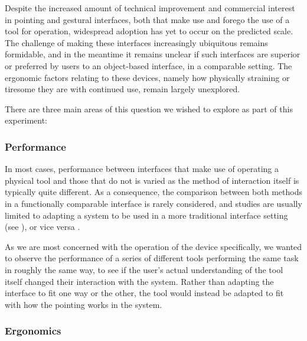 Despite the increased amount of technical improvement and commercial interest in pointing and gestural interfaces, both that make use and forego the use of a tool for operation, widespread adoption has yet to occur on the predicted scale. The challenge of making these interfaces increasingly ubiquitous remains formidable, and in the meantime it remains unclear if such interfaces are superior or preferred by users to an object-based interface, in a comparable setting. The ergonomic factors relating to these devices, namely how physically straining or tiresome they are with continued use, remain largely unexplored.

There are three main areas of this question we wished to explore as part of this experiment:


\subsubsection{Performance}

In most cases, performance between interfaces that make use of operating a physical tool and those that do not is varied as the method of interaction itself is typically quite different. As a consequence, the comparison between both methods in a functionally comparable interface is rarely considered, and studies are usually limited to adapting a system to be used in a more traditional interface setting (see \cite{CabralEtAl2005}), or vice versa .

As we are most concerned with the operation of the device specifically, we wanted to observe the performance of a series of different tools performing the same task in roughly the same way, to see if the user's actual understanding of the tool itself changed their interaction with the system. Rather than adapting the interface to fit one way or the other, the tool would instead be adapted to fit with how the pointing works in the system.

\subsubsection{Ergonomics}

